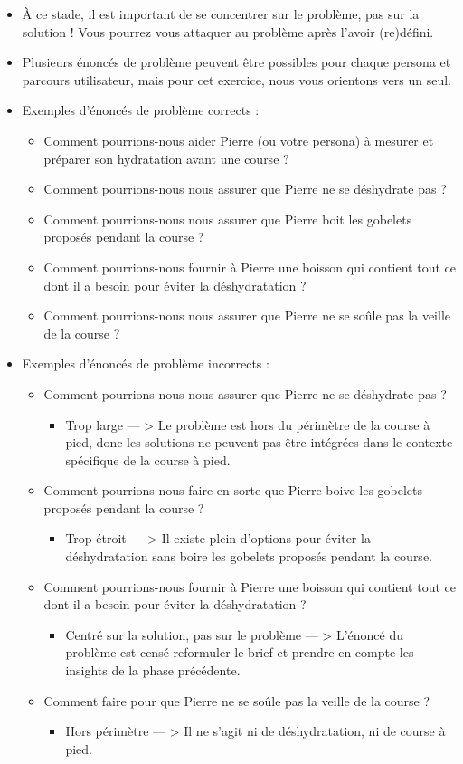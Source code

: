 \begin{itemize}
\item À ce stade, il est important de se concentrer sur le problème, pas sur la solution ! Vous pourrez vous attaquer au problème après l'avoir (re)défini.
\item Plusieurs énoncés de problème peuvent être possibles pour chaque persona et parcours utilisateur, mais pour cet exercice, nous vous orientons vers un seul.
\item Exemples d'énoncés de problème corrects :
\begin{itemize}
\item Comment pourrions-nous aider Pierre (ou votre persona) à mesurer et préparer son hydratation avant une course ?
\item Comment pourrions-nous nous assurer que Pierre ne se déshydrate pas ?
\item Comment pourrions-nous nous assurer que Pierre boit les gobelets proposés pendant la course ?
\item Comment pourrions-nous fournir à Pierre une boisson qui contient tout ce dont il a besoin pour éviter la déshydratation ?
\item Comment pourrions-nous nous assurer que Pierre ne se soûle pas la veille de la course ?
\end{itemize}
\item Exemples d'énoncés de problème incorrects :
\begin{itemize}
\item Comment pourrions-nous nous assurer que Pierre ne se déshydrate pas ?
\begin{itemize}
\item Trop large  --- > Le problème est hors du périmètre de la course à pied, donc les solutions ne peuvent pas être intégrées dans le contexte spécifique de la course à pied.
\end{itemize}
\item Comment pourrions-nous faire en sorte que Pierre boive les gobelets proposés pendant la course ?
\begin{itemize}
\item Trop étroit  --- > Il existe plein d'options pour éviter la déshydratation sans boire les gobelets proposés pendant la course.
\end{itemize}
\item Comment pourrions-nous fournir à Pierre une boisson qui contient tout ce dont il a besoin pour éviter la déshydratation ?
\begin{itemize}
\item Centré sur la solution, pas sur le problème  --- > L'énoncé du problème est censé reformuler le brief et prendre en compte les insights de la phase précédente.
\end{itemize}
\item Comment faire pour que Pierre ne se soûle pas la veille de la course ?
\begin{itemize}
\item Hors périmètre  --- > Il ne s'agit ni de déshydratation, ni de course à pied.
\end{itemize}
\end{itemize}
\end{itemize}

